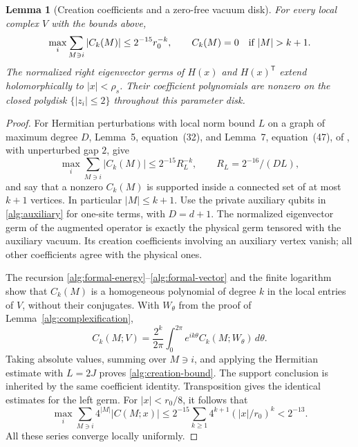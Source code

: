\documentclass[reqno]{amsart}
\newtheorem{lemma}[theorem]{Lemma}
\theoremstyle{definition}
\theoremstyle{remark}
\begin{document}
\begin{lemma}[Creation coefficients and a zero-free vacuum disk]
\label{alg:creation-disk}
For every local complex \(V\) with the bounds above,
\begin{equation}\label{alg:creation-bound}
 \max_i\sum_{M\ni i}|C_k(M)|\le2^{-15}r_0^{-k},
 \qquad C_k(M)=0\quad\hbox{if }|M|>k+1.
\end{equation}
The normalized right eigenvector germs of \(H(x)\) and
\(H(x)^{\mathsf T}\) extend holomorphically to \(|x|<\rho_s\).
Their coefficient polynomials are nonzero on the closed polydisk
\(\{|z_i|\le2\}\) throughout this parameter disk.
\end{lemma}

\begin{proof}
For Hermitian perturbations with local norm bound \(L\) on a graph
of maximum degree \(D\), Lemma~5, equation~(32), and Lemma~7,
equation~(47), of \cite{BDL08}, with unperturbed gap \(2\), give
\[
 \max_i\sum_{M\ni i}|C_k(M)|\le2^{-15}R_L^{-k},
 \qquad R_L=2^{-16}/(DL),
\]
and say that a nonzero \(C_k(M)\) is supported inside a connected
set of at most \(k+1\) vertices.  In particular \(|M|\le k+1\).
Use the private auxiliary qubits in \eqref{alg:auxiliary} for
one-site terms, with \(D=d+1\).  The normalized eigenvector germ
of the augmented operator is exactly the physical germ tensored
with the auxiliary vacuum.  Its creation coefficients involving
an auxiliary vertex vanish; all other coefficients agree with
the physical ones.

The recursion \eqref{alg:formal-energy}--\eqref{alg:formal-vector}
and the finite logarithm show that \(C_k(M)\) is a homogeneous
polynomial of degree \(k\) in the local entries of \(V\), without
their conjugates.  With \(W_\theta\) from the proof of
Lemma~\ref{alg:complexification},
\[
 C_k(M;V)=\frac{2^k}{2\pi}\int_0^{2\pi}
              e^{ik\theta}C_k(M;W_\theta)\,d\theta.
\]
Taking absolute values, summing over \(M\ni i\), and applying the
Hermitian estimate with \(L=2J\) proves
\eqref{alg:creation-bound}.  The support conclusion is inherited
by the same coefficient identity.  Transposition gives the
identical estimates for the left germ.
For \(|x|<r_0/8\), it follows that
\begin{equation}\label{alg:weighted-creation}
 \max_i\sum_{M\ni i}4^{|M|}|C(M;x)|
 \le 2^{-15}\sum_{k\ge1}4^{k+1}(|x|/r_0)^k
 <2^{-13}.
\end{equation}
All these series converge locally uniformly.


\end{proof}
\end{document}
